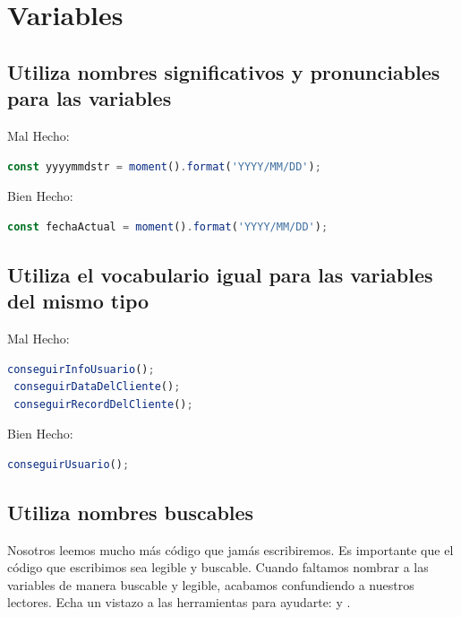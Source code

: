 \documentclass[a4paper, 12pt]{article}
\begin{document}
\newpage

\section{Variables}

\subsection*{Utiliza nombres significativos y pronunciables para las variables}

Mal Hecho:
\begin{lstlisting}[language=TypeScript, style=badstyle]
 const yyyymmdstr = moment().format('YYYY/MM/DD');
\end{lstlisting}
\vspace{0.5cm} %

Bien Hecho:
\begin{lstlisting}[language=TypeScript, style=goodstyle]
 const fechaActual = moment().format('YYYY/MM/DD');
\end{lstlisting}

\subsection*{Utiliza el vocabulario igual para las variables del mismo tipo}

Mal Hecho:
\begin{lstlisting}[language=TypeScript, style=badstyle]
 conseguirInfoUsuario();
 conseguirDataDelCliente();
 conseguirRecordDelCliente();
\end{lstlisting}
\vspace{0.5cm} %

Bien Hecho:
\begin{lstlisting}[language=TypeScript, style=goodstyle]
 conseguirUsuario();
\end{lstlisting}

\subsection*{Utiliza nombres buscables}

Nosotros leemos mucho más código que jamás escribiremos. Es importante que el código que escribimos sea legible y buscable. Cuando faltamos nombrar a las variables de manera buscable y legible, acabamos confundiendo a nuestros lectores. Echa un vistazo a las herramientas para ayudarte:  y .
\end{document}
